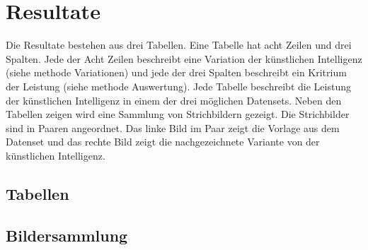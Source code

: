 \chapter{Resultate}
Die Resultate bestehen aus drei Tabellen. Eine Tabelle hat acht Zeilen und drei
Spalten. Jede der Acht Zeilen beschreibt eine Variation der künstlichen
Intelligenz (siehe methode Variationen) und jede der drei Spalten beschreibt ein Kritrium  %
der Leistung (siehe methode Auswertung). Jede Tabelle beschreibt die Leistung  %
der künstlichen Intelligenz in einem der drei möglichen Datensets. Neben den
Tabellen zeigen wird eine Sammlung von Strichbildern gezeigt. Die Strichbilder
sind in Paaren angeordnet. Das linke Bild im Paar zeigt die Vorlage aus dem
Datenset und das rechte Bild zeigt die nachgezeichnete Variante von der
künstlichen Intelligenz.

\section{Tabellen}


\section{Bildersammlung}
